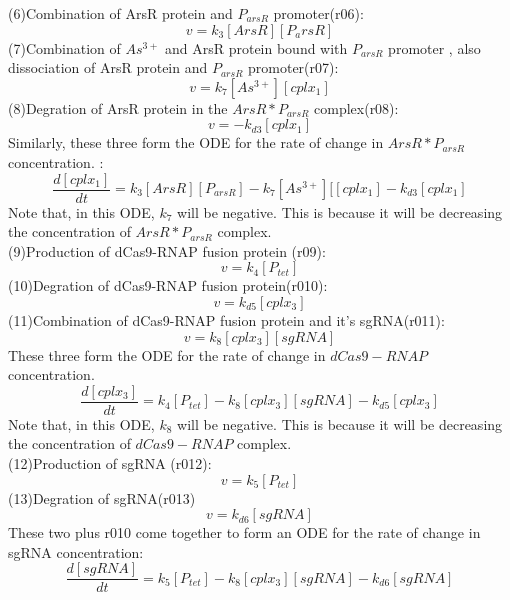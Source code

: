 (6)Combination of ArsR protein and $P_{arsR}$ promoter(r06):
\begin{displaymath}
v=k_3[ArsR][P_arsR]
\end{displaymath}
(7)Combination of $As^{3+}$ and ArsR protein bound with $P_{arsR}$ promoter , also dissociation of ArsR protein and $P_{arsR}$ promoter(r07):
\begin{displaymath}
v=k_7[As^{3+}][cplx_1]
\end{displaymath}
(8)Degration of ArsR protein in the  $ArsR*P_{arsR}$ complex(r08):
\begin{displaymath}
v=-k_{d3}[cplx_1]
\end{displaymath}
Similarly, these three form the ODE for the rate of change in  $ArsR*P_{arsR}$ concentration.  :
\begin{equation}
\frac{d[cplx_1]}{dt}=k_3[ArsR][P_{arsR}]-k_7[As^{3+}][[cplx_1]-k_{d3}[cplx_1] \tag{3}
\end{equation}
Note that, in this ODE, $k_7$ will be negative. This is because it will be decreasing the concentration of  $ArsR*P_{arsR}$ complex.\\
(9)Production of dCas9-RNAP fusion protein (r09):
\begin{displaymath}
v=k_4[P_{tet}]
\end{displaymath}
(10)Degration of dCas9-RNAP fusion protein(r010):
\begin{displaymath}
v=k_{d5}[cplx_3]
\end{displaymath}
(11)Combination of dCas9-RNAP fusion protein and it's sgRNA(r011):
\begin{displaymath}
v=k_{8}[cplx_3][sgRNA]
\end{displaymath}
These three form the ODE for the rate of change in $dCas9-RNAP$ concentration.
\begin{equation}
\frac{d[cplx_3]}{dt}=k_4[P_{tet}]-k_{8}[cplx_3][sgRNA]-k_{d5}[cplx_3] \tag{4}
\end{equation}
Note that, in this ODE, $k_8$ will be negative. This is because it will be decreasing the concentration of  $dCas9-RNAP$ complex.\\
(12)Production of sgRNA (r012):
\begin{displaymath}
v=k_5[P_{tet}]
\end{displaymath}
(13)Degration of sgRNA(r013)
\begin{displaymath}
v=k_{d6}[sgRNA]
\end{displaymath}
These two plus r010 come together to form an ODE for the rate of change in sgRNA concentration:
\begin{equation}
\frac{d[sgRNA]}{dt}=k_5[P_{tet}]-k_{8}[cplx_3][sgRNA]-k_{d6}[sgRNA] \tag{5}
\end{equation}
